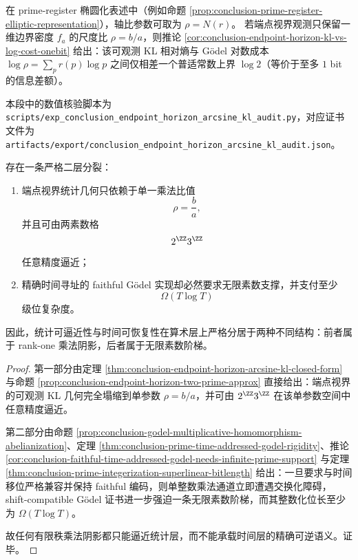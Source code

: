 \begin{remark}\label{rem:conclusion-endpoint-horizon-prime-register-interface}
在 prime-register 椭圆化表述中（例如命题 \ref{prop:conclusion-prime-register-elliptic-representation}），轴比参数可取为 \(\rho=N(r)\)。
若端点视界观测只保留一维边界密度 \(f_a\) 的尺度比 \(\rho=b/a\)，则推论 \ref{cor:conclusion-endpoint-horizon-kl-vs-log-cost-onebit} 给出：该可观测 KL 相对熵与 Gödel 对数成本 \(\log\rho=\sum_p r(p)\log p\) 之间仅相差一个普适常数上界 \(\log 2\)（等价于至多 \(1\) bit 的信息差额）。
\par
本段中的数值核验脚本为 \texttt{scripts/exp\_conclusion\_endpoint\_horizon\_arcsine\_kl\_audit.py}，对应证书文件为 \texttt{artifacts/export/conclusion\_endpoint\_horizon\_arcsine\_kl\_audit.json}。
\end{remark}

\begin{theorem}[端点统计轴与时间寻址账本轴的二层不可压缩分裂]\label{thm:conclusion-endpoint-statistics-vs-time-address-ledger-splitting}
存在一条严格二层分裂：
\begin{enumerate}
  \item 端点视界统计几何只依赖于单一乘法比值
  \[
  \rho=\frac{b}{a},
  \]
  并且可由两素数格
  \[
  2^{\ZZ}3^{\ZZ}
  \]
  任意精度逼近；
  \item 精确时间寻址的 faithful Gödel 实现却必然要求无限素数支撑，并支付至少
  \[
  \Omega(T\log T)
  \]
  级位复杂度。
\end{enumerate}
因此，统计可逼近性与时间可恢复性在算术层上严格分居于两种不同结构：前者属于 rank-one 乘法阴影，后者属于无限素数阶梯。
\end{theorem}

\begin{proof}
第一部分由定理 \ref{thm:conclusion-endpoint-horizon-arcsine-kl-closed-form} 与命题 \ref{prop:conclusion-endpoint-horizon-two-prime-approx} 直接给出：端点视界的可观测 KL 几何完全塌缩到单参数 \(\rho=b/a\)，并可由 \(2^{\ZZ}3^{\ZZ}\) 在该单参数空间中任意精度逼近。

第二部分由命题 \ref{prop:conclusion-godel-multiplicative-homomorphism-abelianization}、定理 \ref{thm:conclusion-prime-time-addressed-godel-rigidity}、推论 \ref{cor:conclusion-faithful-time-addressed-godel-needs-infinite-prime-support} 与定理 \ref{thm:conclusion-prime-integerization-superlinear-bitlength} 给出：一旦要求与时间移位严格兼容并保持 faithful 编码，则单整数乘法通道立即遭遇交换化障碍，shift-compatible Gödel 证书进一步强迫一条无限素数阶梯，而其整数化位长至少为 \(\Omega(T\log T)\)。

故任何有限秩乘法阴影都只能逼近统计层，而不能承载时间层的精确可逆语义。证毕。
\end{proof}


